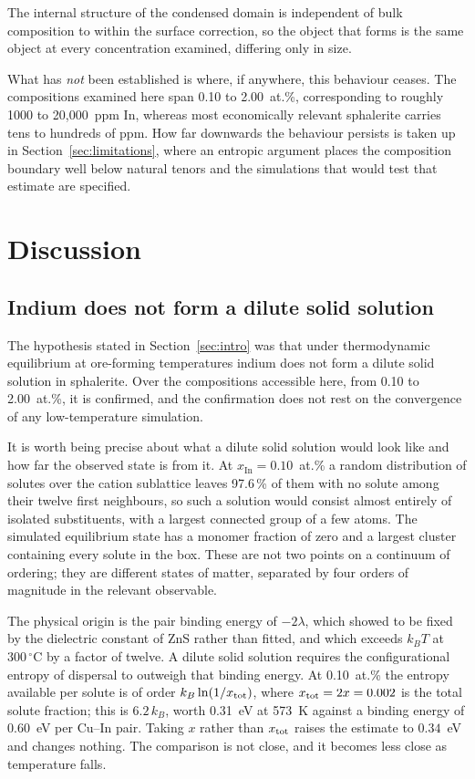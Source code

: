 \documentclass[11pt,a4paper]{article}
\begin{document}
The internal structure of the condensed domain is independent of bulk
composition to within the surface correction, so the object that forms is the
same object at every concentration examined, differing only in size.

What has \emph{not} been established is where, if anywhere, this behaviour
ceases. The compositions examined here span 0.10 to 2.00~at.\%, corresponding
to roughly 1000 to 20{,}000~ppm In, whereas most economically relevant
sphalerite carries tens to hundreds of ppm. How far downwards the behaviour
persists is taken up in Section~\ref{sec:limitations}, where an entropic
argument places the composition boundary well below natural tenors and the
simulations that would test that estimate are specified.

\section{Discussion}
\label{sec:discussion}

\subsection{Indium does not form a dilute solid solution}

The hypothesis stated in Section~\ref{sec:intro} was that under thermodynamic
equilibrium at ore-forming temperatures indium does not form a dilute solid
solution in sphalerite. Over the compositions accessible here, from 0.10 to
2.00~at.\%, it is confirmed, and the confirmation does not rest on the
convergence of any low-temperature simulation.

It is worth being precise about what a dilute solid solution would look like and
how far the observed state is from it. At $x_{\mathrm{In}} = 0.10$~at.\% a random
distribution of solutes over the cation sublattice leaves 97.6\,\% of them with
no solute among their twelve first neighbours, so such a solution would consist
almost entirely of isolated substituents, with a largest connected group of a
few atoms. The simulated equilibrium state has a monomer fraction of zero and a
largest cluster containing every solute in the box. These are not two points on
a continuum of ordering; they are different states of matter, separated by four
orders of magnitude in the relevant observable.

The physical origin is the pair binding energy of $-2\lambda$, which
\citet{yu2026} showed to be fixed by the dielectric constant of ZnS rather than
fitted, and which exceeds $k_BT$ at $300\,^\circ$C by a factor of twelve. A
dilute solid solution requires the configurational entropy of dispersal to
outweigh that binding energy. At 0.10~at.\% the entropy available per solute is of order
$k_B \ln(1/x_{\rm tot})$, where $x_{\rm tot} = 2x = 0.002$ is the total solute
fraction; this is $6.2\,k_B$, worth 0.31~eV at 573~K against a binding energy of
0.60~eV per Cu--In pair. Taking $x$ rather than $x_{\rm tot}$ raises the estimate
to $0.34$~eV and changes nothing. The comparison is not close, and it
becomes less close as temperature falls.
\end{document}
